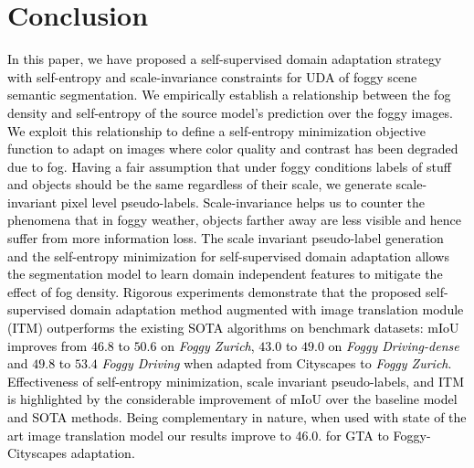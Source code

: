 \documentclass[final,5p,times,twocolumn]{elsarticle}
\begin{document}
\section{Conclusion}
\label{sec:Conclusion}
\textcolor{black}{
In this paper, we have proposed a self-supervised domain adaptation strategy with self-entropy and scale-invariance constraints for UDA of foggy scene semantic segmentation. 
We empirically establish a relationship between the fog density and self-entropy of the source model's prediction over the foggy images. We exploit this relationship to define a self-entropy minimization objective function to  adapt on images where color quality and contrast has been degraded due to fog. 
Having a fair assumption that under foggy conditions labels of stuff and objects should be the same regardless of their scale, we generate scale-invariant pixel level pseudo-labels.
Scale-invariance helps us to counter the phenomena that in foggy weather, objects farther away are less visible and hence suffer from more information loss. The scale invariant pseudo-label generation and the self-entropy minimization for self-supervised domain adaptation allows the segmentation model to learn domain independent features to mitigate the effect of fog density.
Rigorous experiments demonstrate that the proposed self-supervised domain adaptation method augmented with image translation module (ITM) outperforms the existing SOTA algorithms on benchmark datasets: mIoU improves from $46.8$ to $50.6$ on \textit{Foggy Zurich}, $43.0$ to $49.0$ on \textit{Foggy Driving-dense } and $49.8$ to $53.4$ \textit{Foggy Driving} when adapted from Cityscapes to \textit{Foggy Zurich}. Effectiveness of self-entropy minimization, scale invariant pseudo-labels, and ITM is highlighted by the considerable improvement of mIoU over the baseline model and SOTA methods. 
\textcolor{black}{Being complementary in nature, when used with state of the art image translation model our results improve to 46.0. for GTA to Foggy-Cityscapes adaptation.}}











\end{document}

